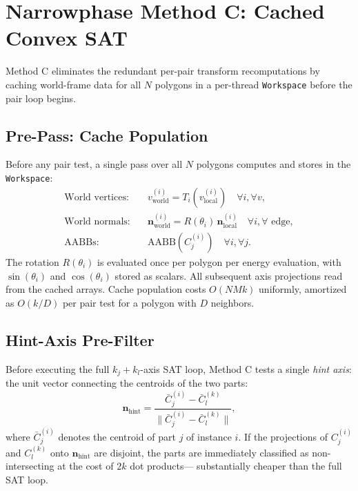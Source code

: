 \section{Narrowphase Method C: Cached Convex SAT}
\label{sec:method-c}

Method C eliminates the redundant per-pair transform recomputations
by caching world-frame data for all $N$ polygons in a per-thread
\texttt{Workspace} before the pair loop begins.

\subsection{Pre-Pass: Cache Population}

Before any pair test, a single pass over all $N$ polygons computes and
stores in the \texttt{Workspace}:
\begin{align}
  \text{World vertices:}\quad &
  v^{(i)}_{\mathrm{world}} = T_i(v^{(i)}_{\mathrm{local}})
  \quad \forall i, \forall v, \label{eq:cache-verts} \\
  \text{World normals:}\quad &
  \mathbf{n}^{(i)}_{\mathrm{world}} = R(\theta_i)\,\mathbf{n}^{(i)}_{\mathrm{local}}
  \quad \forall i, \forall \text{ edge}, \label{eq:cache-normals} \\
  \text{AABBs:}\quad &
  \mathrm{AABB}(C_j^{(i)})
  \quad \forall i, \forall j. \label{eq:cache-aabb}
\end{align}
The rotation $R(\theta_i)$ is evaluated once per polygon per energy
evaluation, with $\sin(\theta_i)$ and $\cos(\theta_i)$ stored as scalars.
All subsequent axis projections read from the cached arrays.
Cache population costs $O(NMk)$ uniformly, amortized as $O(k/D)$ per
pair test for a polygon with $D$ neighbors.

\subsection{Hint-Axis Pre-Filter}

Before executing the full $k_j + k_l$-axis SAT loop, Method C tests a
single \emph{hint axis}: the unit vector connecting the centroids of
the two parts:
\[
  \mathbf{n}_{\mathrm{hint}}
  = \frac{\bar{C}_j^{(i)} - \bar{C}_l^{(k)}}
         {\|\bar{C}_j^{(i)} - \bar{C}_l^{(k)}\|},
\]
where $\bar{C}_j^{(i)}$ denotes the centroid of part $j$ of instance $i$.
If the projections of $C_j^{(i)}$ and $C_l^{(k)}$ onto
$\mathbf{n}_{\mathrm{hint}}$ are disjoint, the parts are immediately
classified as non-intersecting at the cost of $2k$ dot products---
substantially cheaper than the full SAT loop.

